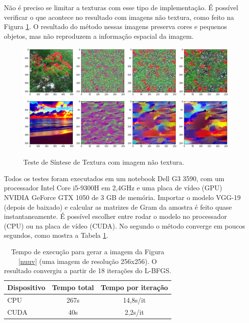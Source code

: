 
\newpage
Não é preciso se limitar a texturas com
esse tipo de implementação. É possível verificar
o que acontece no resultado com imagens não textura, 
como feito na Figura \ref{nontex}.
O resultado do método nessas imagens preserva
cores e pequenos objetos, mas não reproduzem
a informação espacial da imagem.

\begin{figure}[!ht]
	\centering
	\includegraphics[width=\linewidth]{files/assets/results/result7.png}
	\includegraphics[width=\linewidth]{files/assets/results/result8.png}
	\caption{Teste de Síntese de Textura com imagem não textura.}
	\label{nontex}
\end{figure}

Todos os testes foram executados em um notebook
Dell G3 3590, com um processador Intel Core i5-9300H
em 2,4GHz e uma placa de vídeo (GPU) NVIDIA GeForce GTX 1050
de 3 GB de memória.
Importar o modelo VGG-19 (depois de baixado) 
e calcular as matrizes de Gram
da amostra é feito quase instantaneamente.
É possível escolher entre rodar o modelo no processador
(CPU) ou na placa de vídeo (CUDA). No segundo
o método converge em poucos segundos,
como mostra a Tabela \ref{tabela}.


\begin{table}[ht]
	\centering
	\caption{Tempo de execução para gerar a imagem da Figura \ref{nuuv}
	(uma imagem de resolução 256x256).
	O resultado convergiu a partir de 18 iterações do L-BFGS.}
	\label{tabela}
	\begin{centering}
		\begin{tabularx}{/3}{||X|c|c||}
			\hline Dispositivo & Tempo total & Tempo por iteração \\
			\hline CPU & 267s & 14,8s/it \\
			\hline CUDA & 40s & 2,2s/it \\
			\hline
		\end{tabularx}
	\end{centering}
\end{table}

